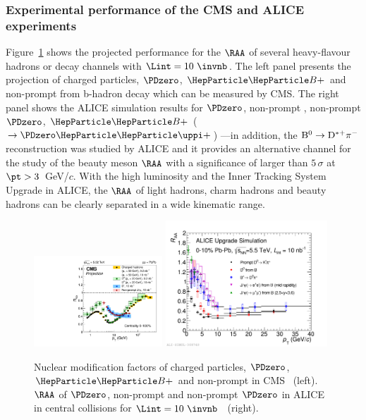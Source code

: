 
\subsubsection{Experimental performance of the CMS and ALICE experiments}
\label{sec:HFRAAv2}

Figure~\ref{fig:RAAv2.RAA} shows the projected performance for the $\RAA$ of several heavy-flavour hadrons or decay channels with $\Lint=10~\invnb$. The left panel presents the projection of charged particles, $\PDzero$, $\PBp$ and non-prompt \PJGy from b-hadron decay which can be measured by CMS. The right panel shows the ALICE simulation results for $\PDzero$, non-prompt \PJGy, non-prompt $\PDzero$, $\PBp$ ($\rightarrow \PDzero \PGpp$) 
---in addition, the $\rm B^0\rightarrow D^{*+}\pi^-$ reconstruction was studied by ALICE and it provides an alternative channel for the study of the beauty meson $\RAA$ with a significance of larger than $5\,\sigma$ at $\pt > 3$~GeV/$c$. With the high luminosity and the Inner Tracking System Upgrade in ALICE, the $\RAA$ of light hadrons, charm hadrons and beauty hadrons can be clearly separated in a wide kinematic range.

\begin{figure}[ht]
  \begin{center}
    \includegraphics[width=0.43\textwidth]{hf/figures/cRAA_lumiTG_10_lumiMB_0_v2_right.pdf}
   \includegraphics[width=0.54\textwidth]{hf/figures/ALICEUpgrade_charmbeautyRAA.pdf}
    \caption{Nuclear modification factors of charged particles, $\PDzero$, $\PBp$ and non-prompt \PJGy in CMS~\cite{CMS-PAS-FTR-17-002} (left). $\RAA$ of $\PDzero$, non-prompt \PJGy and non-prompt $\PDzero$ in ALICE in central \PbPb collisions for $\Lint=10~\invnb$~\cite{Abelev:1625842} (right).}
    \label{fig:RAAv2.RAA}
  \end{center}
\end{figure}



